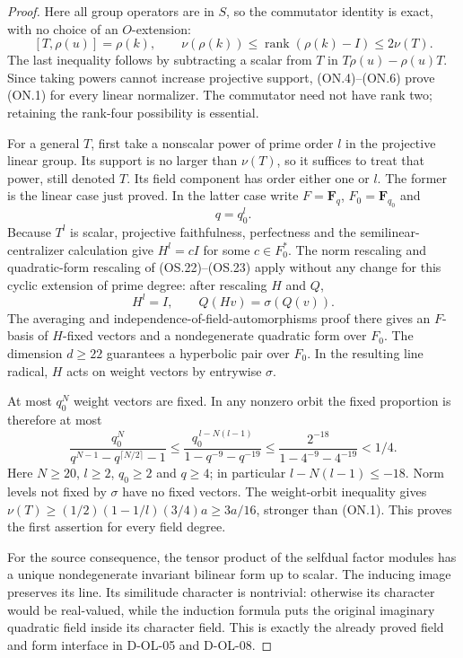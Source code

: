 \begin{proof}
Here all group operators are in $S$, so the commutator identity
is exact, with no choice of an $O$-extension:
\[
 [T,\rho(u)]=\rho(k),\qquad
 \nu(\rho(k))\le\operatorname{rank}(\rho(k)-I)\le2\nu(T).
                                                               \tag{ON.6}
\]
The last inequality follows by subtracting a scalar from $T$ in
$T\rho(u)-\rho(u)T$.  Since taking powers cannot increase
projective support, (ON.4)--(ON.6) prove (ON.1) for every linear
normalizer.  The commutator need not have rank two; retaining
the rank-four possibility is essential.

For a general $T$, first take a nonscalar power of prime order
$l$ in the projective linear group.  Its support is no larger
than $\nu(T)$, so it suffices to treat that power, still denoted
$T$.  Its field component has order either one or $l$.
The former is the linear case just proved.  In the latter case
write $F=\mathbf F_q$, $F_0=\mathbf F_{q_0}$ and
\[
                        q=q_0^l.                           \tag{ON.7}
\]
Because $T^l$ is scalar, projective faithfulness, perfectness and
the semilinear-centralizer calculation give $H^l=cI$ for some
$c\in F_0^*$.  The norm rescaling and quadratic-form rescaling
of (OS.22)--(OS.23) apply without any change for this cyclic
extension of prime degree: after rescaling $H$ and $Q$,
\[
                  H^l=I,\qquad Q(Hv)=\sigma(Q(v)).           \tag{ON.8}
\]
The averaging and independence-of-field-automorphisms proof there
gives an $F$-basis of $H$-fixed vectors and a nondegenerate
quadratic form over $F_0$.  The dimension $d\ge22$ guarantees a
hyperbolic pair over $F_0$.  In the resulting line radical, $H$
acts on weight vectors by entrywise $\sigma$.

At most $q_0^N$ weight vectors are fixed.  In any nonzero orbit
the fixed proportion is therefore at most
\[
 \frac{q_0^N}{q^{N-1}-q^{\lceil N/2\rceil}-1}
 \le\frac{q_0^{\,l-N(l-1)}}{1-q^{-9}-q^{-19}}
 \le\frac{2^{-18}}{1-4^{-9}-4^{-19}}<1/4.                   \tag{ON.9}
\]
Here $N\ge20$, $l\ge2$, $q_0\ge2$ and $q\ge4$; in
particular $l-N(l-1)\le-18$.  Norm levels not fixed by $\sigma$
have no fixed vectors.  The weight-orbit inequality gives
$\nu(T)\ge(1/2)(1-1/l)(3/4)a\ge3a/16$, stronger than
(ON.1).  This proves the first assertion for every field degree.

For the source consequence, the tensor product of the selfdual
factor modules has a unique nondegenerate invariant bilinear
form up to scalar.  The inducing image preserves its line.
Its similitude character is nontrivial: otherwise its character
would be real-valued, while the induction formula puts the
original imaginary quadratic field inside its character field.
This is exactly the already proved field and form interface
in D-OL-05 and D-OL-08.


\end{proof}
